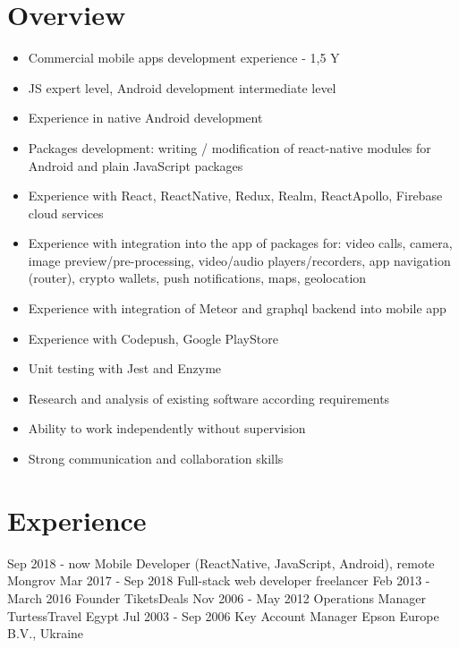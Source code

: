 \documentclass[letterpaper]{twentysecondcv} %
\begin{document}
\makeprofile %

\section{Overview}
\begin{itemize}
\item Commercial mobile apps development experience - 1,5 Y
\item JS expert level, Android development intermediate level
\item Experience in native Android development 
\item Packages development: writing / modification of react-native modules for Android and plain JavaScript packages
\item Experience with React, ReactNative, Redux, Realm, ReactApollo, Firebase cloud services
\item Experience with integration into the app of packages for: video calls, camera, image preview/pre-processing, video/audio players/recorders, app navigation (router), crypto wallets, push notifications, maps, geolocation
\item Experience with integration of Meteor and graphql backend into mobile app
\item Experience with Codepush, Google PlayStore
\item Unit testing with Jest and Enzyme
\item Research and analysis of existing software according requirements
\item Ability to work independently without supervision
\item Strong communication and collaboration skills
\end{itemize}

\section{Experience}

\begin{twenty} %
	\twentyitem
    	{Sep 2018} 
        {- now}
        {Mobile Developer (ReactNative, JavaScript, Android), remote}
        {}
        {Mongrov}
        {}
    \twentyitem
    	{Mar 2017}
        {- Sep 2018}
        {Full-stack web developer}
        {}
        {freelancer}
        {}
	\twentyitem
    	{Feb 2013}
        {- March 2016}
        {Founder}
        {}
        {TiketsDeals}
        {}
    \twentyitem
    	{Nov 2006}
        {- May 2012}
        {Operations Manager}
        {}
        {TurtessTravel Egypt}
        {}
    \twentyitem
    	{Jul 2003}
        {- Sep 2006}
        {Key Account Manager}
        {}
        {Epson Europe B.V., Ukraine}
        {}
\end{twenty}
\end{document}
